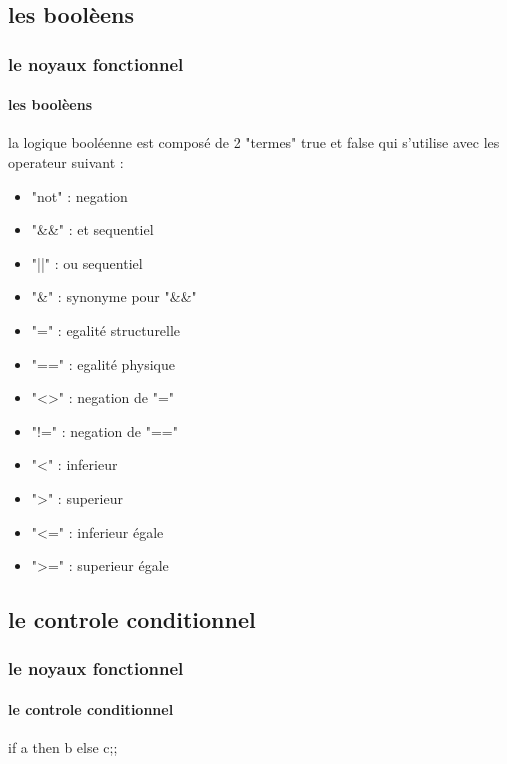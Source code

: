   \subsection{les boolèens}
\begin{frame}
    \frametitle{le noyaux fonctionnel}
    \framesubtitle{les boolèens}
      la logique booléenne est composé de 2 "termes" true et false qui s'utilise avec les operateur suivant :
      \begin{center}
      \begin{minipage}[t]{7cm}
	  \begin{itemize}
	    \item "not" : negation
	    \item "\&\&" : et sequentiel
	    \item "||" : ou sequentiel
	    \item "\&" : synonyme pour "\&\&"
	  \end{itemize}
	\end{minipage}
      \end{center}
	\begin{minipage}[t]{5cm}
	  \begin{itemize}
	    \item "=" : egalité structurelle
	    \item "==" : egalité physique
	    \item "<>" : negation de "="
	    \item "!=" : negation de "=="
	  \end{itemize}
	\end{minipage}
	\begin{minipage}[t]{5cm}
	  \begin{itemize}
	    \item "<" : inferieur 
	    \item ">" : superieur
	    \item "<=" : inferieur égale
	    \item ">=" : superieur égale
	  \end{itemize}
	\end{minipage}
\end{frame}

    \subsection{le controle conditionnel}
\begin{frame}
      \frametitle{le noyaux fonctionnel}
      \framesubtitle{le controle conditionnel}
      if a then b else c;;
\end{frame}

